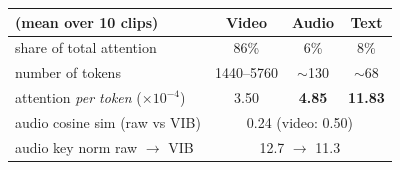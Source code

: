 \begin{tabular}{lccc}
\toprule
(mean over 10 clips) & Video & Audio & Text \\
\midrule
share of total attention & 86\% & 6\% & 8\% \\
number of tokens & 1440--5760 & $\sim$130 & $\sim$68 \\
\rowcolor{Soft} attention \emph{per token} ($\times10^{-4}$) & 3.50 & \textbf{4.85} & \textbf{11.83} \\
\midrule
audio cosine sim (raw vs VIB) & \multicolumn{3}{c}{0.24 \;(video: 0.50)} \\
audio key norm raw $\to$ VIB & \multicolumn{3}{c}{12.7 $\to$ 11.3} \\
\bottomrule
\end{tabular}
